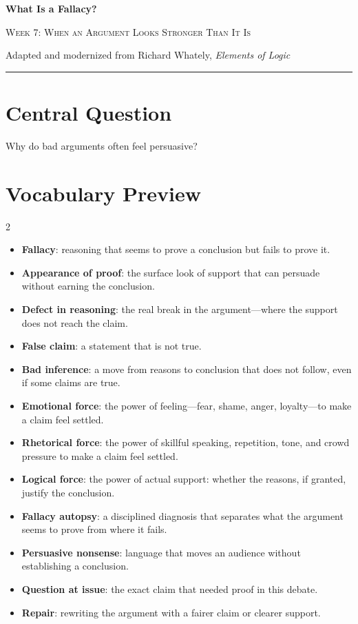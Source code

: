 \documentclass[12pt]{article}
\begin{document}
\begin{center}
{\LARGE\bfseries What Is a Fallacy?}\par\vspace{0.25em}
{\large\scshape Week 7: When an Argument Looks Stronger Than It Is}\par\vspace{0.5em}
{Adapted and modernized from Richard Whately, \textit{Elements of Logic}}\par\vspace{0.6em}
\rule{0.82\textwidth}{0.4pt}
\end{center}

\section*{Central Question}
Why do bad arguments often feel persuasive?

\section*{Vocabulary Preview}
\begin{multicols}{2}
\begin{itemize}[leftmargin=*, itemsep=0.18em]
\item \textbf{Fallacy}: reasoning that seems to prove a conclusion but fails to prove it.
\item \textbf{Appearance of proof}: the surface look of support that can persuade without earning the conclusion.
\item \textbf{Defect in reasoning}: the real break in the argument---where the support does not reach the claim.
\item \textbf{False claim}: a statement that is not true.
\item \textbf{Bad inference}: a move from reasons to conclusion that does not follow, even if some claims are true.
\item \textbf{Emotional force}: the power of feeling---fear, shame, anger, loyalty---to make a claim feel settled.
\item \textbf{Rhetorical force}: the power of skillful speaking, repetition, tone, and crowd pressure to make a claim feel settled.
\item \textbf{Logical force}: the power of actual support: whether the reasons, if granted, justify the conclusion.
\item \textbf{Fallacy autopsy}: a disciplined diagnosis that separates what the argument seems to prove from where it fails.
\item \textbf{Persuasive nonsense}: language that moves an audience without establishing a conclusion.
\item \textbf{Question at issue}: the exact claim that needed proof in this debate.
\item \textbf{Repair}: rewriting the argument with a fairer claim or clearer support.
\end{itemize}
\end{multicols}
\end{document}
